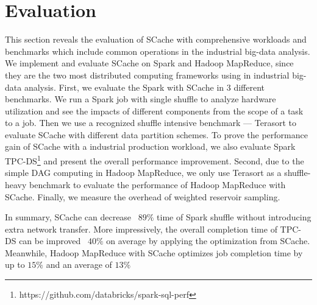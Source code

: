 \section{Evaluation}\label{evaluation}
{\color{black}
This section reveals the evaluation of SCache with comprehensive workloads and benchmarks which include common operations in the industrial big-data analysis. 
We implement and evaluate SCache on Spark and Hadoop MapReduce, since they are the two most distributed computing frameworks using in industrial big-data analysis.
First, we evaluate the Spark with SCache in 3 different benchmarks.
We run a Spark job with single shuffle to analyze hardware utilization and see the impacts of different components from the scope of a task to a job. 
Then we use a recognized shuffle intensive benchmark --- Terasort to evaluate SCache with different data partition schemes.
To prove the performance gain of SCache with a industrial production workload, we also evaluate Spark TPC-DS\footnote{https://github.com/databricks/spark-sql-perf} and present the overall performance improvement.
Second, due to the simple DAG computing in Hadoop MapReduce, we only use Terasort as a shuffle-heavy benchmark to evaluate the performance of Hadoop MapReduce with SCache.
}
Finally, we measure the overhead of weighted reservoir sampling. 

In summary, SCache can decrease ~$89\%$ time of Spark shuffle without introducing extra network transfer.
More impressively, the overall completion time of TPC-DS can be improved ~$40\%$ on average by applying the optimization from SCache.
{\color{black}Meanwhile, Hadoop MapReduce with SCache optimizes job completion time by up to $15\%$ and an average of $13\%$}

